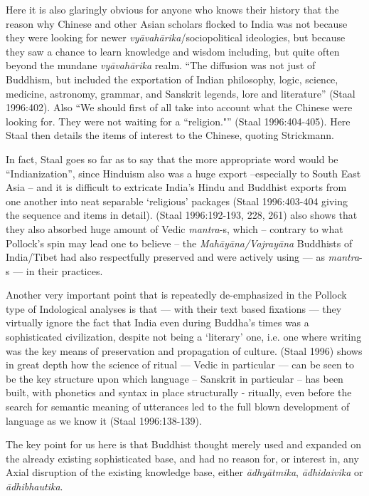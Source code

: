 Here it is also glaringly obvious for anyone who knows their history that the reason why Chinese and other Asian scholars flocked to India was not because they were looking for newer \textit{vyāvahārika}/sociopolitical ideologies, but because they saw a chance to learn knowledge and wisdom including, but quite often beyond the mundane \textit{vyāvahārika} realm. “The diffusion was not just of Buddhism, but included the exportation of Indian philosophy, logic, science, medicine, astronomy, grammar, and Sanskrit legends, lore and literature” (Staal 1996:402). Also “We should first of all take into account what the Chinese were looking for. They were not waiting for a ``religion."” (Staal 1996:404-405). Here Staal then details the items of interest to the Chinese, quoting Strickmann.

In fact, Staal goes so far as to say that the more appropriate word would be “Indianization”, since Hinduism also was a huge export –especially to South East Asia – and it is difficult to extricate India’s Hindu and Buddhist exports from one another into neat separable ‘religious’ packages (Staal 1996:403-404 giving the sequence and items in detail). (Staal 1996:192-193, 228, 261) also shows that they also absorbed huge amount of Vedic \textit{mantra}-s, which – contrary to what Pollock’s spin may lead one to believe – the \textit{Mahāyāna/Vajrayāna} Buddhists of India/Tibet had also respectfully preserved and were actively using --- as \textit{mantra}-s --- in their practices.

Another very important point that is repeatedly de-emphasized in the Pollock type of Indological analyses is that --- with their text based fixations --- they virtually ignore the fact that India even during Buddha’s times was a sophisticated civilization, despite not being a ‘literary’ one, i.e. one where writing was the key means of preservation and propagation of culture. (Staal 1996) shows in great depth how the science of ritual --- Vedic in particular --- can be seen to be the key structure upon which language – Sanskrit in particular – has been built, with phonetics and syntax in place structurally - ritually, even before the search for semantic meaning of utterances led to the full blown development of language as we know it (Staal 1996:138-139).

The key point for us here is that Buddhist thought merely used and expanded on the already existing sophisticated base, and had no reason for, or interest in, any Axial disruption of the existing knowledge base, either \textit{ādhyātmika}, \textit{ādhidaivika} or \textit{ādhibhautika}.

